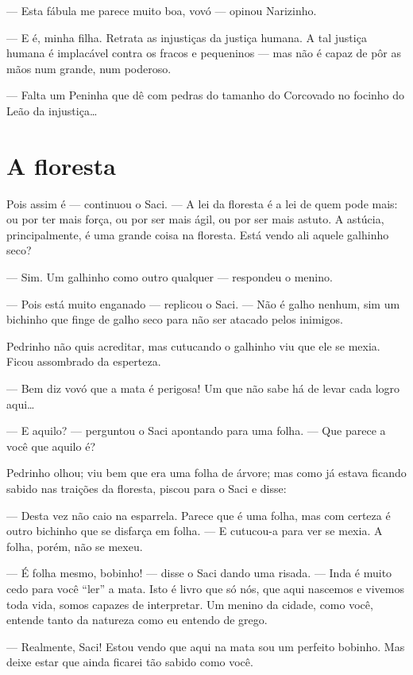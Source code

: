 --- Esta fábula me parece muito boa, vovó --- opinou Narizinho.

--- E é, minha filha. Retrata as injustiças da justiça humana. A tal
justiça humana é implacável contra os fracos e pequeninos --- mas não é
capaz de pôr as mãos num grande, num poderoso.

--- Falta um Peninha que dê com pedras do tamanho do Corcovado no
focinho do Leão da injustiça\ldots{}


\chapter{A floresta}

Pois assim é --- continuou o Saci. --- A lei da floresta é a lei de quem
pode mais: ou por ter mais força, ou por ser mais ágil, ou por ser mais
astuto. A astúcia, principalmente, é uma grande coisa na floresta. Está
vendo ali aquele galhinho seco?

--- Sim. Um galhinho como outro qualquer --- respondeu o menino.

--- Pois está muito enganado --- replicou o Saci. --- Não é galho
nenhum, sim um bichinho que finge de galho seco para não ser atacado
pelos inimigos.

Pedrinho não quis acreditar, mas cutucando o galhinho viu que ele se
mexia. Ficou assombrado da esperteza.

--- Bem diz vovó que a mata é perigosa! Um que não sabe há de levar cada
logro aqui\ldots{}

--- E aquilo? --- perguntou o Saci apontando para uma folha. --- Que
parece a você que aquilo é?

Pedrinho olhou; viu bem que era uma folha de árvore; mas como já estava
ficando sabido nas traições da floresta, piscou para o Saci e disse:

--- Desta vez não caio na esparrela. Parece que é uma folha, mas com
certeza é outro bichinho que se disfarça em folha. --- E cutucou-a para
ver se mexia. A folha, porém, não se mexeu.

--- É folha mesmo, bobinho! --- disse o Saci dando uma risada. --- Inda
é muito cedo para você ``ler'' a mata. Isto é livro que só nós, que aqui
nascemos e vivemos toda vida, somos capazes de interpretar. Um menino da
cidade, como você, entende tanto da natureza como eu entendo de grego.

--- Realmente, Saci! Estou vendo que aqui na mata sou um perfeito
bobinho. Mas deixe estar que ainda ficarei tão sabido como você.

